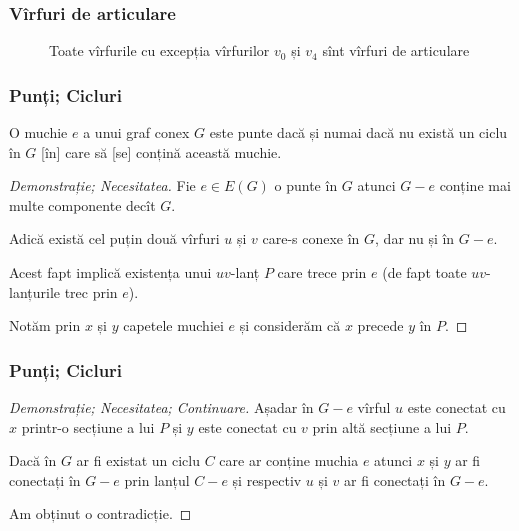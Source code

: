 \begin{frame}
  \frametitle{Vîrfuri de articulare}

\begin{figure}
\centering%
\caption{Toate vîrfurile cu excepția vîrfurilor $v_0$ și $v_4$ sînt vîrfuri de articulare}
\end{figure}
 
\end{frame}


\begin{frame}
  \frametitle{Punți; Cicluri}

\begin{theorem}\label{GTA-2.3}
O muchie $e$ a unui graf conex $G$ este punte dacă și numai dacă nu există un 
ciclu în $G$ [în] care să [se] conțină această muchie.
\end{theorem}
\begin{proof}[Demonstrație; Necesitatea]
Fie $e\in E(G)$ o punte în $G$ atunci $G-e$ conține mai multe componente decît $G$. \pause

Adică există cel puțin două vîrfuri $u$ și $v$ care-s conexe în $G$, dar nu și în $G-e$. \pause

Acest fapt implică existența unui $uv$-lanț $P$ care trece prin $e$ (de fapt toate $uv$-lanțurile trec prin $e$). \pause

Notăm prin $x$ și $y$ capetele muchiei $e$ și considerăm că $x$ precede $y$ în $P$. 

\end{proof} 
\end{frame}



\begin{frame}
  \frametitle{Punți; Cicluri}

\begin{proof}[Demonstrație; Necesitatea; Continuare]

Așadar în $G-e$ vîrful $u$ este conectat cu $x$ printr-o secțiune a lui $P$ și $y$ este conectat cu $v$ prin altă secțiune a lui $P$. \pause

Dacă în $G$ ar fi existat un ciclu $C$ care ar conține muchia $e$ atunci $x$ și $y$ ar fi conectați în $G-e$ prin lanțul $C-e$ și respectiv $u$ și $v$ ar fi conectați în $G-e$. \pause

Am obținut o contradicție.
 
\end{proof}


\end{frame}


